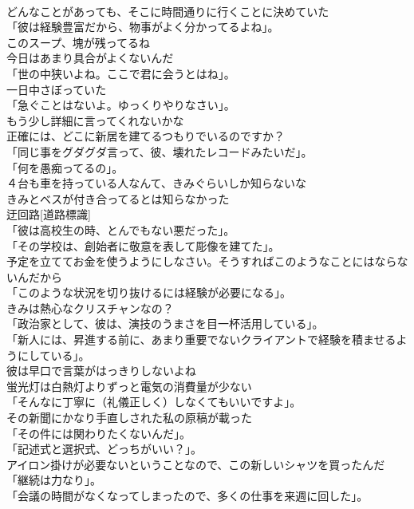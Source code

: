 \documentclass[8pt]{extreport}
\begin{document}
\begin{CJK}{UTF8}{min}
\\	どんなことがあっても、そこに時間通りに行くことに決めていた	
\\	「彼は経験豊富だから、物事がよく分かってるよね」。	
\\	このスープ、塊が残ってるね	
\\	今日はあまり具合がよくないんだ	
\\	「世の中狭いよね。ここで君に会うとはね」。	
\\	一日中さぼっていた	
\\	「急ぐことはないよ。ゆっくりやりなさい」。	
\\	もう少し詳細に言ってくれないかな	
\\	正確には、どこに新居を建てるつもりでいるのですか？	
\\	「同じ事をグダグダ言って、彼、壊れたレコードみたいだ」。	
\\	「何を愚痴ってるの」。	
\\	４台も車を持っている人なんて、きみぐらいしか知らないな	
\\	きみとベスが付き合ってるとは知らなかった	
\\	迂回路[道路標識]	
\\	「彼は高校生の時、とんでもない悪だった」。	
\\	「その学校は、創始者に敬意を表して彫像を建てた」。	
\\	予定を立ててお金を使うようにしなさい。そうすればこのようなことにはならないんだから	
\\	「このような状況を切り抜けるには経験が必要になる」。	
\\	きみは熱心なクリスチャンなの？	
\\	「政治家として、彼は、演技のうまさを目一杯活用している」。	
\\	「新人には、昇進する前に、あまり重要でないクライアントで経験を積ませるようにしている」。	
\\	彼は早口で言葉がはっきりしないよね	
\\	蛍光灯は白熱灯よりずっと電気の消費量が少ない	
\\	「そんなに丁寧に（礼儀正しく）しなくてもいいですよ」。	
\\	その新聞にかなり手直しされた私の原稿が載った	
\\	「その件には関わりたくないんだ」。	
\\	「記述式と選択式、どっちがいい？」。	
\\	アイロン掛けが必要ないということなので、この新しいシャツを買ったんだ	
\\	「継続は力なり」。	
\\	「会議の時間がなくなってしまったので、多くの仕事を来週に回した」。	

\end{CJK}
\end{document}
